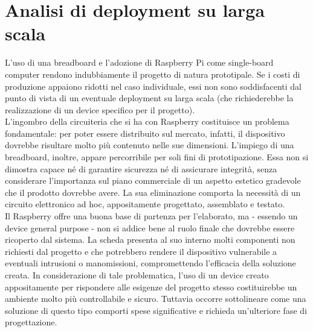 \documentclass[12pt]{article}
\begin{document}
\section{Analisi di deployment su larga scala}

L'uso di una breadboard e l'adozione di Raspberry Pi come single-board computer rendono indubbiamente il progetto di natura prototipale. Se i costi di produzione appaiono ridotti nel caso individuale, essi non sono soddisfacenti dal punto di vista di un eventuale deployment su larga scala (che richiederebbe la realizzazione di un device specifico per il progetto).\\

L'ingombro della circuiteria che si ha con Raspberry costituisce un problema fondamentale: per poter essere distribuito sul mercato, infatti, il dispositivo dovrebbe risultare molto più contenuto nelle sue dimensioni. L'impiego di una breadboard, inoltre, appare percorribile per soli fini di prototipazione. Essa non si dimostra capace né di garantire sicurezza né di assicurare integrità, senza considerare l'importanza sul piano commerciale di un aspetto estetico gradevole che il prodotto dovrebbe avere. La sua eliminazione comporta la necessità di un circuito elettronico ad hoc, appositamente progettato, assemblato e testato.\\
Il Raspberry offre una buona base di partenza per l'elaborato, ma - essendo un device general purpose - non si addice bene al ruolo finale che dovrebbe essere ricoperto dal sistema. La scheda presenta al suo interno molti componenti non richiesti dal progetto e che potrebbero rendere il dispositivo vulnerabile a eventuali intrusioni o manomissioni, compromettendo l'efficacia della soluzione creata. In considerazione di tale problematica, l'uso di un device creato appositamente per rispondere alle esigenze del progetto stesso costituirebbe un ambiente molto più controllabile e sicuro. Tuttavia occorre sottolineare come una soluzione di questo tipo comporti spese significative e richieda un'ulteriore fase di progettazione.\\
\end{document}
